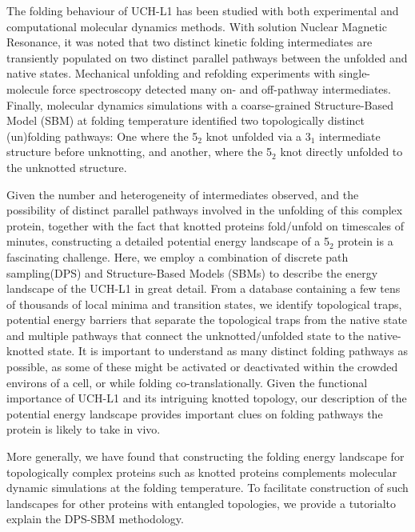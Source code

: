 \documentclass[journal=jacsat]{achemso}
\begin{document}
The folding behaviour of UCH-L1 has been studied with both experimental\cite{Lou16a,Lee18a,Bishop16a,Das06a,Zhang16a,Andersson09a} and computational molecular dynamics methods\cite{Zhao18a}. With solution Nuclear Magnetic Resonance\cite{Lou16a,Lee18a}, it was noted that two distinct kinetic folding intermediates are transiently populated on two distinct parallel pathways between the unfolded and native states. Mechanical unfolding and refolding experiments with single-molecule force spectroscopy\cite{Ziegler16a} detected many on- and off-pathway intermediates. Finally, molecular dynamics simulations with a coarse-grained Structure-Based Model (SBM) at folding temperature identified two topologically distinct (un)folding pathways: One where the 5$_2$ knot unfolded via a 3$_1$ intermediate structure before unknotting, and another, where the 5$_2$ knot  directly unfolded to the unknotted structure.

Given the number and heterogeneity of intermediates observed, and the possibility of distinct parallel pathways involved in the unfolding of this complex protein, together with the fact that knotted proteins fold/unfold on timescales of minutes, constructing a detailed potential energy landscape of a 5$_2$ protein is a fascinating challenge. Here, we employ a combination of discrete path sampling\cite{DPS1}(DPS) and Structure-Based Models (SBMs)\cite{Neelamraju20a,Neelamraju19a,Neelamraju18a,smog} to describe the energy landscape of the UCH-L1 in great detail. From a database containing a few tens of thousands of local minima and transition states, we identify topological traps, potential energy barriers that separate the topological traps from the native state and multiple pathways that connect the unknotted/unfolded state to the native-knotted state. It is important to understand as many distinct folding pathways as possible, as some of these might be activated or deactivated within the crowded environs of a cell\cite{Aaden14a}, or while folding co-translationally\cite{Bitran20a}. Given the functional importance of UCH-L1\cite{} and its intriguing knotted topology, our description of the potential energy landscape provides important clues on folding pathways the protein is likely to take in vivo. 

More generally, we have found that constructing the folding energy landscape for topologically complex proteins such as knotted proteins complements molecular dynamic simulations at the folding temperature. To facilitate construction of such landscapes for other proteins with entangled topologies, we provide a  tutorialto explain the DPS-SBM methodology\cite{Neelamraju20a}.
\end{document}
